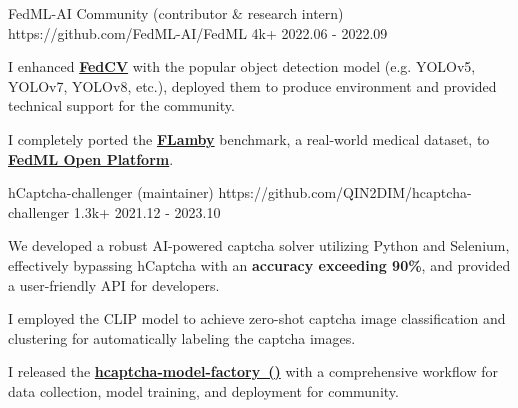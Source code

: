 {}

\begin{cventries}

\cvproject
{FedML-AI Community (contributor \& research intern)} %
{https://github.com/FedML-AI/FedML} %
{4k+} %
{2022.06 - 2022.09} %
{
\begin{cvitems} %
\item {I enhanced \href{https://github.com/FedML-AI/FedCV}{\textbf{FedCV}} with the popular object detection model (e.g. YOLOv5, YOLOv7, YOLOv8, etc.), deployed them to produce environment and provided technical support for the community.}
\item {I completely ported the \href{https://github.com/owkin/FLamby}{\textbf{FLamby}} benchmark, a real-world medical dataset, to \href{https://open.fedml.ai/}{\textbf{FedML Open Platform}}.}
\end{cvitems}
} %



\cvproject
{hCaptcha-challenger (maintainer)} %
{https://github.com/QIN2DIM/hcaptcha-challenger} %
{1.3k+} %
{2021.12 - 2023.10} %
{
\begin{cvitems} %
\item {We developed a robust AI-powered captcha solver utilizing Python and Selenium, effectively bypassing hCaptcha with an \textbf{accuracy exceeding 90\%}, and provided a user-friendly API for developers.}
\item {I employed the CLIP model to achieve zero-shot captcha image classification and clustering for automatically labeling the captcha images.}
\item {I released the \href{https://github.com/CaptchaAgent/hcaptcha-model-factory}{\textbf{hcaptcha-model-factory~()}} with a comprehensive workflow for data collection, model training, and deployment for community.}
\end{cvitems}
} %



\end{cventries}
